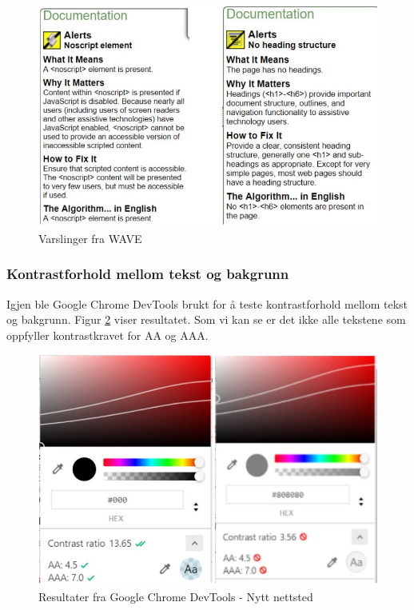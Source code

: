 \begin{figure}[H]
    \centering
    \includegraphics[width=\textwidth]{bereket/Wave-test-varsel-ny-nettsted.png}
    \caption{Varslinger fra WAVE}
    \label{fig:analysis-new-wave-warnings}
\end{figure}

\subsubsection{Kontrastforhold mellom tekst og bakgrunn}
Igjen ble Google Chrome DevTools brukt for å teste kontrastforhold mellom tekst og bakgrunn. Figur \ref{fig:analysis-new-chrome-devtools} viser resultatet. Som vi kan se er det ikke alle tekstene som oppfyller kontrastkravet for AA og AAA. 
\begin{figure}[H]
    \centering
    \includegraphics[width=\textwidth]{bereket/Kontrast-test.png}
    \caption{Resultater fra Google Chrome DevTools - Nytt nettsted}
    \label{fig:analysis-new-chrome-devtools}
\end{figure}

